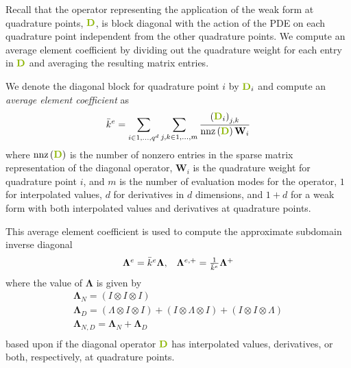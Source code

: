 Recall that the operator representing the application of the weak form at quadrature points, ${\color{applegreen}\mathbf{D}}$, is block diagonal with the action of the PDE on each quadrature point independent from the other quadrature points.
We compute an average element coefficient by dividing out the quadrature weight for each entry in ${\color{applegreen}\mathbf{D}}$ and averaging the resulting matrix entries.

\begin{definition}\label{def:averageelementcoefficient}
We denote the diagonal block for quadrature point $i$ by ${\color{applegreen}\mathbf{D}}_i$ and compute an \textit{average element coefficient} as
\begin{equation}
\bar{k}^e = \sum_{i \in 1, ..., q^d} \sum_{j, k \in 1, ..., m} \frac{\left( {\color{applegreen}\mathbf{D}}_{i} \right)_{j, k}}{\text{nnz} \left( {\color{applegreen}\mathbf{D}} \right) \mathbf{W}_i}
\end{equation}
where $\text{nnz} \left( {\color{applegreen}\mathbf{D}} \right)$ is the number of nonzero entries in the sparse matrix representation of the diagonal operator, $\mathbf{W}_i$ is the quadrature weight for quadrature point $i$, and $m$ is the number of evaluation modes for the operator, $1$ for interpolated values, $d$ for derivatives in $d$ dimensions, and $1 + d$ for a weak form with both interpolated values and derivatives at quadrature points.
\end{definition}

This average element coefficient is used to compute the approximate subdomain inverse diagonal
\begin{equation}
\begin{array}{c c}
\mathbf{\Lambda}^e = \bar{k}^e \mathbf{\Lambda},  &  \mathbf{\Lambda}^{e, +} = \frac{1}{\bar{k}^e} \mathbf{\Lambda}^{+}
\end{array}
\end{equation}
where the value of $\mathbf{\Lambda}$ is given by
\begin{equation}
\begin{array}{c}
\mathbf{\Lambda}_N      = \left( I \otimes I \otimes I \right)  \\
\mathbf{\Lambda}_D      = \left( \Lambda \otimes I \otimes I\right) + \left( I \otimes \Lambda \otimes I\right) + \left( I \otimes I \otimes \Lambda \right)  \\
\mathbf{\Lambda}_{N, D} = \mathbf{\Lambda}_N + \mathbf{\Lambda}_D  \\
\end{array}
\end{equation}
based upon if the diagonal operator ${\color{applegreen}\mathbf{D}}$ has interpolated values, derivatives, or both, respectively, at quadrature points.

